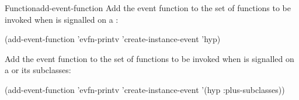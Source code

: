 \documentclass[10pt,twoside,english,pdftex]{article}
\begin{document}
\begin{functiondoc}{Function}{add-event-function}
\fnexamples
{}%
Add the event function  to the set of functions
to be invoked when  is signalled on a
 :
\begin{example}
  (add-event-function 'evfn-printv 'create-instance-event 'hyp)
\end{example}

Add the event function  to the set of functions
to be invoked when  is signalled on a
  or its subclasses:
\begin{example}
  (add-event-function 'evfn-printv 'create-instance-event '(hyp :plus-subclasses))
\end{example}

\fnnotes
\instanceevfnsnyi

\end{functiondoc}

\end{document}
